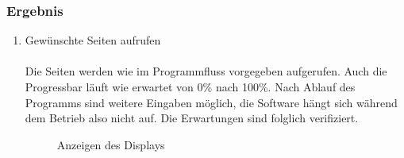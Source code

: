 \subsubsection{Ergebnis}\label{subsubsec:Hardware_Gesamtsystem_Ergebnis2}
\begin{enumerate}

\item Gewünschte Seiten aufrufen\\
\\
Die Seiten werden wie im Programmfluss vorgegeben aufgerufen. Auch die Progressbar läuft wie erwartet von 0\% nach 100\%. Nach Ablauf des Programms sind weitere Eingaben möglich, die Software hängt sich während dem Betrieb also nicht auf. Die Erwartungen sind folglich verifiziert.
\begin{figure}[h!]
\centering
{}
\hfill
{}
\hfill
\caption{Anzeigen des Displays}
\label{fig:Hardware_LED_1}
\end{figure}


\end{enumerate}
